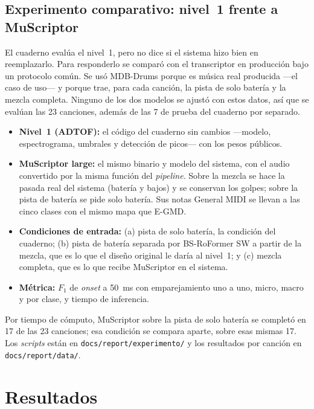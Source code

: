 \documentclass[11pt,a4paper]{article}
\begin{document}
\subsection{Experimento comparativo: nivel~1 frente a MuScriptor}
\label{sec:experimento}
El cuaderno evalúa el nivel~1, pero no dice si el sistema hizo bien en reemplazarlo. Para responderlo se
comparó con el transcriptor en producción bajo un protocolo común. Se usó MDB-Drums porque es música
real producida ---el caso de uso--- y porque trae, para cada canción, la pista de solo batería y la
mezcla completa. Ninguno de los dos modelos se ajustó con estos datos, así que se evalúan las 23
canciones, además de las 7 de prueba del cuaderno por separado.

\begin{itemize}[leftmargin=1.5em]
\item \textbf{Nivel~1 (ADTOF):} el código del cuaderno sin cambios ---modelo, espectrograma, umbrales y
detección de picos--- con los pesos públicos.
\item \textbf{MuScriptor large:} el mismo binario y modelo del sistema, con el audio convertido por la
misma función del \emph{pipeline}. Sobre la mezcla se hace la pasada real del sistema (batería y bajos)
y se conservan los golpes; sobre la pista de batería se pide solo batería. Sus notas General MIDI se
llevan a las cinco clases con el mismo mapa que E-GMD.
\item \textbf{Condiciones de entrada:} (a) pista de solo batería, la condición del cuaderno; (b) pista
de batería separada por BS-RoFormer SW a partir de la mezcla, que es lo que el diseño original le daría
al nivel~1; y (c) mezcla completa, que es lo que recibe MuScriptor en el sistema.
\item \textbf{Métrica:} $F_1$ de \emph{onset} a 50~ms con emparejamiento uno a uno, micro, macro y por clase,
y tiempo de inferencia.
\end{itemize}
Por tiempo de cómputo, MuScriptor sobre la pista de solo batería se completó en 17 de las 23 canciones;
esa condición se compara aparte, sobre esas mismas 17. Los \emph{scripts} están en
\texttt{docs/report/experimento/} y los resultados por canción en \texttt{docs/report/data/}.

\section{Resultados}
\label{sec:resultados}
\end{document}
